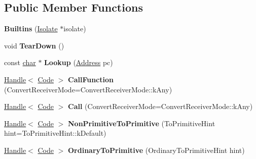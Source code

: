 \subsection*{Public Member Functions}
\begin{DoxyCompactItemize}
\item 
\mbox{\label{classv8_1_1internal_1_1Builtins_a97c44fffbf3eb107fb5b103a4e0f63c7}} 
{\bfseries Builtins} (\mbox{\hyperlink{classv8_1_1internal_1_1Isolate}{Isolate}} $\ast$isolate)
\item 
\mbox{\label{classv8_1_1internal_1_1Builtins_a0dd5f6b191e420297c6e6cfa801df51e}} 
void {\bfseries Tear\+Down} ()
\item 
\mbox{\label{classv8_1_1internal_1_1Builtins_a40f1da2773953f670eaecbd09275ea8f}} 
const \mbox{\hyperlink{classchar}{char}} $\ast$ {\bfseries Lookup} (\mbox{\hyperlink{classuintptr__t}{Address}} pc)
\item 
\mbox{\label{classv8_1_1internal_1_1Builtins_abf93e2758c8b7624fe71fdabc254283b}} 
\mbox{\hyperlink{classv8_1_1internal_1_1Handle}{Handle}}$<$ \mbox{\hyperlink{classv8_1_1internal_1_1Code}{Code}} $>$ {\bfseries Call\+Function} (Convert\+Receiver\+Mode=Convert\+Receiver\+Mode\+::k\+Any)
\item 
\mbox{\label{classv8_1_1internal_1_1Builtins_acc1e2d06fe68563bfca2f892ff211af3}} 
\mbox{\hyperlink{classv8_1_1internal_1_1Handle}{Handle}}$<$ \mbox{\hyperlink{classv8_1_1internal_1_1Code}{Code}} $>$ {\bfseries Call} (Convert\+Receiver\+Mode=Convert\+Receiver\+Mode\+::k\+Any)
\item 
\mbox{\label{classv8_1_1internal_1_1Builtins_a986aaf32afbf26d3909e079897971c76}} 
\mbox{\hyperlink{classv8_1_1internal_1_1Handle}{Handle}}$<$ \mbox{\hyperlink{classv8_1_1internal_1_1Code}{Code}} $>$ {\bfseries Non\+Primitive\+To\+Primitive} (To\+Primitive\+Hint hint=To\+Primitive\+Hint\+::k\+Default)
\item 
\mbox{\label{classv8_1_1internal_1_1Builtins_a8bda196da1ca0088962ecae686d117ad}} 
\mbox{\hyperlink{classv8_1_1internal_1_1Handle}{Handle}}$<$ \mbox{\hyperlink{classv8_1_1internal_1_1Code}{Code}} $>$ {\bfseries Ordinary\+To\+Primitive} (Ordinary\+To\+Primitive\+Hint hint)

\end{DoxyCompactItemize}
